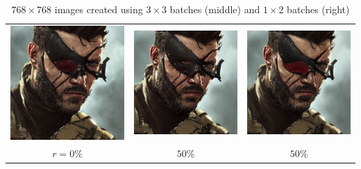 \begin{table}[!htb]
\centering
\begin{tabular}{c c c}
    \includegraphics[width=0.3\linewidth]{static/sample_imgs/comp_part/beardman_0.png} & \includegraphics[width=0.3\linewidth]{static/sample_imgs/comp_part/beardman_3x3_50.png} &
    \includegraphics[width=0.3\linewidth]{static/sample_imgs/comp_part/beardman_1x2_50.png}\\
    \(r=0\%\) & \(50\%\) & \(50\%\) \\
\end{tabular}
\caption{$768 \times 768$ images created using $3 \times 3$ batches (middle) and $1 \times 2$ batches (right)}
\end{table}



